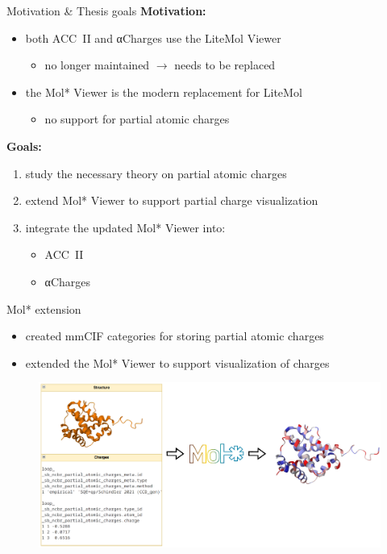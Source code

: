 \documentclass[
]{beamer}
\begin{document}
\begin{frame}{Motivation \& Thesis goals}
  \textbf{Motivation:}
  \begin{itemize}
    \item both ACC~II and αCharges use the LiteMol Viewer
    \begin{itemize}
      \item no longer maintained $\rightarrow$ needs to be replaced
    \end{itemize}
    \item the Mol* Viewer is the modern replacement for LiteMol
    \begin{itemize}
      \item no support for partial atomic charges
    \end{itemize}
  \end{itemize}
  \vspace{10pt}
  \textbf{Goals:}
  \begin{enumerate}
    \item study the necessary theory on partial atomic charges
    \item extend Mol* Viewer to support partial charge visualization
    \item integrate the updated Mol* Viewer into:
    \begin{itemize}
      \item ACC~II
      \item αCharges
    \end{itemize}
  \end{enumerate}
\end{frame}
    
\begin{frame}{Mol* extension}
  \begin{itemize}
    \item created mmCIF categories for storing partial atomic charges
    \item extended the Mol* Viewer to support visualization of charges
  \end{itemize}
  \begin{figure}
    \includegraphics[width=\textwidth,keepaspectratio]{images/molstar-use-case.png}
  \end{figure}
\end{frame}
\end{document}
